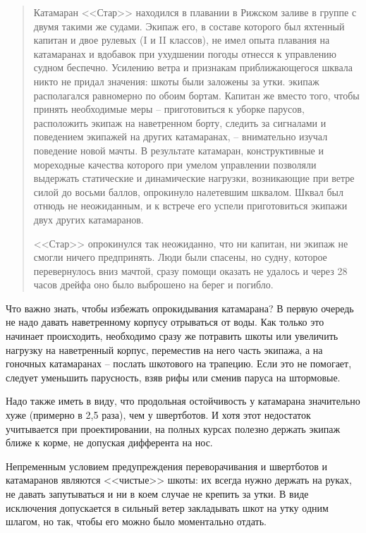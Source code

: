\documentclass[a4paper, 12pt, twoside, final]{scrbook}
\begin{document}
\begin{quote}
Катамаран <<Стар>> находился в плавании в Рижском заливе в группе с двумя такими же судами. Экипаж его, в составе которого был яхтенный капитан и двое рулевых (I и II классов), не имел опыта плавания на катамаранах и вдобавок при ухудшении погоды отнесся к управлению судном беспечно. Усилению ветра и признакам приближающегося шквала никто не придал значения: шкоты были заложены за утки. экипаж располагался равномерно по обоим бортам. Капитан же вместо того, чтобы принять необходимые меры \--- приготовиться к уборке парусов, расположить экипаж на наветренном борту, следить за сигналами и поведением экипажей на других катамаранах, \--- внимательно изучал поведение новой мачты. В результате катамаран, конструктивные и мореходные качества которого при умелом управлении позволяли выдержать статические и динамические нагрузки, возникающие при ветре силой до восьми баллов, опрокинуло налетевшим шквалом. Шквал был отнюдь не неожиданным, и к встрече его успели приготовиться экипажи двух других катамаранов.

<<Стар>> опрокинулся так неожиданно, что ни капитан, ни экипаж не смогли ничего предпринять. Люди были спасены, но судну, которое перевернулось вниз мачтой, сразу помощи оказать не удалось и через 28 часов дрейфа оно было выброшено на берег и погибло.
\end{quote}

Что важно знать, чтобы избежать опрокидывания катамарана? В первую очередь не надо давать наветренному корпусу отрываться от воды. Как только это начинает происходить, необходимо сразу же потравить шкоты или увеличить нагрузку на наветренный корпус, переместив на него часть экипажа, а на гоночных катамаранах \--- послать шкотового на трапецию. Если это не помогает, следует уменьшить парусность, взяв рифы или сменив паруса на штормовые.

Надо также иметь в виду, что продольная остойчивость у катамарана значительно хуже (примерно в 2,5 раза), чем у швертботов. И хотя этот недостаток учитывается при проектировании, на полных курсах полезно держать экипаж ближе к корме, не допуская дифферента на нос.

Непременным условием предупреждения переворачивания и швертботов и катамаранов являются <<чистые>> шкоты: их всегда нужно держать на руках, не давать запутываться и ни в коем случае не крепить за утки. В виде исключения допускается в сильный ветер закладывать шкот на утку одним шлагом, но так, чтобы его можно было моментально отдать.
\end{document}
